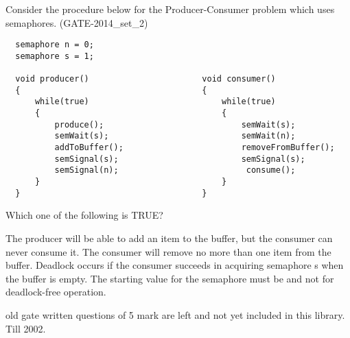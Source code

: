 \vspace{0.08in}

\begin{minipage}{\linewidth}

  \question  Consider the procedure below for the Producer-Consumer problem which uses semaphores. (GATE-2014\_set\_2)
  \begin{lstlisting}
  semaphore n = 0;
  semaphore s = 1;

  void producer()                       void consumer()
  {                                     {
      while(true)                           while(true)
      {                                     {
          produce();                            semWait(s);
          semWait(s);                           semWait(n);
          addToBuffer();                        removeFromBuffer();
          semSignal(s);                         semSignal(s);
          semSignal(n);                          consume();
      }                                     }
  }                                     }
  \end{lstlisting}

    Which one of the following is TRUE?

  \begin{choices}
    \choice  The producer will be able to add an item to the buffer, but the consumer can never consume it.
    \choice  The consumer will remove no more than one item from the buffer.
    \choice  Deadlock occurs if the consumer succeeds in acquiring semaphore s when the buffer is empty.
    \choice  The starting value for the semaphore must be and not for deadlock-free operation.
  \end{choices}

  \end{minipage}

\vspace{0.08in}


old gate written questions of 5 mark  are left and not yet included in this library. Till 2002.






\begin{comment}

\begin{minipage}{\linewidth}

  \question  (GATE- )

  \begin{choices}
    \choice
    \choice
    \choice
    \choice
  \end{choices}

  \end{minipage}

\vspace{0.08in}



\end{comment}
